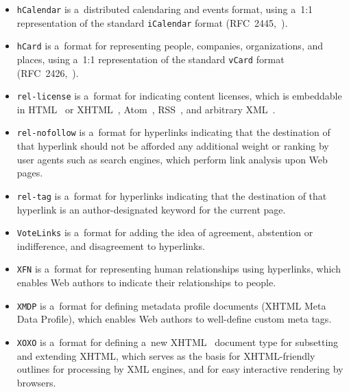 \begin{itemize}
  \item \texttt{hCalendar} is a~distributed calendaring and
        events format, using a~1:1 representation of the standard
        \texttt{iCalendar} format
        (RFC~2445,~\cite{dawson1998icalendar}).
  \item \texttt{hCard} is a~format for representing people,
        companies, organizations, and places, using a~1:1
        representation of the standard \texttt{vCard} format
        (RFC~2426,~\cite{dawson1998vcard}).
  \item \texttt{rel-license} is a~format for indicating content
        licenses, which is embeddable in
        HTML~\cite{raggett1999html} or
        XHTML~\cite{pemberton2000xhtml},
        Atom~\cite{nottingham2005atom},
        RSS~\cite{cadenhead2006rss},
        and arbitrary XML~\cite{bray2008xml}.
  \item \texttt{rel-nofollow} is a~format for hyperlinks
        indicating that the destination of that hyperlink should
        not be afforded any additional weight or ranking by user
        agents such as search engines, which perform link
        analysis upon Web pages.
  \item \texttt{rel-tag} is a~format for hyperlinks indicating
        that the destination of that hyperlink is an
        author-designated keyword for the current page.
  \item \texttt{VoteLinks} is a~format for adding the idea of
        agreement, abstention or indifference, and disagreement
        to hyperlinks.
  \item \texttt{XFN} is a~format for representing human
        relationships using hyperlinks, which enables Web authors
        to indicate their relationships to people.
  \item \texttt{XMDP} is a~format for defining metadata profile
        documents (XHTML Meta Data Profile), which enables Web
        authors to well-define custom meta tags.
  \item \texttt{XOXO} is a~format for defining a~new
        XHTML~\cite{pemberton2000xhtml}
        document type for subsetting and extending XHTML,
        which serves as the basis for XHTML-friendly outlines for
        processing by XML engines, and for easy interactive
        rendering by browsers.
\end{itemize}

